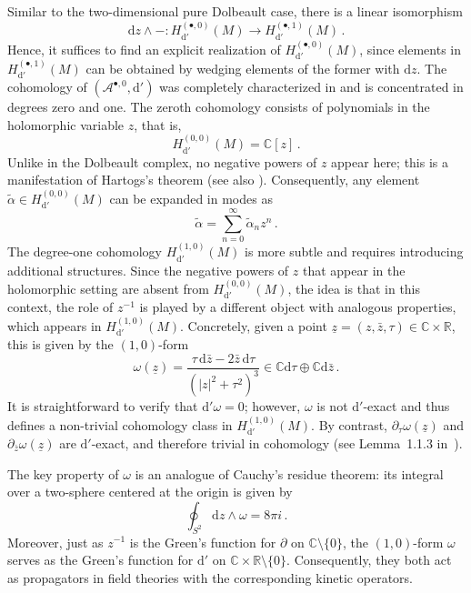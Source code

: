 \documentclass[11pt]{amsart}
\newcommand{\R}{{\mathbb R}}
\newcommand{\C}{{\mathbb C}}
\newcommand{\dr}{{\mathrm{d}}}
\numberwithin{equation}{section}
\numberwithin{figure}{section}
\numberwithin{table}{section}
\renewcommand{\d}{\mathrm{d}}
\theoremstyle{thm}
\numberwithin{equation}{subsection}
\theoremstyle{definition}
\theoremstyle{rem}
\begin{document}
Similar to the two-dimensional pure Dolbeault case, there is a linear isomorphism 
\begin{equation}
\label{ec:lineariso}
    \dr z \wedge -: H^{(\bullet,0)}_{\mathrm{d}'}(M) \to H^{(\bullet,1)}_{\mathrm{d}'}(M) \,.
\end{equation}
Hence, it suffices to find an explicit realization of \( H^{(\bullet,0)}_{\mathrm{d}'}(M) \), since elements in \( H^{(\bullet,1)}_{\mathrm{d}'}(M) \) can be obtained by wedging elements of the former with \(\mathrm{d} z\). The cohomology of \((\mathcal{A}^{\bullet,0}, \mathrm{d}')\) was completely characterized in \cite{Garner:2023zqn} and is concentrated in degrees 
zero and one. The zeroth cohomology consists of polynomials in the holomorphic 
variable \(z\), that is,
\begin{equation}
    H^{(0,0)}_{\mathrm{d}'}(M) = \mathbb{C}[z]\,.
\end{equation}
Unlike in the Dolbeault complex, no negative powers of \(z\) appear here; this is a manifestation of Hartogs's theorem (see also \cite{FAONTE2019389}). 
Consequently, any element \(\tilde{\alpha} \in H^{(0,0)}_{\mathrm{d}'}(M)\) can be 
expanded in modes as
\begin{equation}
    \tilde{\alpha} = \sum_{n=0}^\infty \tilde{\alpha}_n z^n\,.
\end{equation}
The degree-one cohomology \(H^{(1,0)}_{\mathrm{d}'}(M)\) is more subtle and 
requires introducing additional structures. Since the negative powers of 
\(z\) that appear in the holomorphic setting are absent from 
\(H^{(0,0)}_{\mathrm{d}'}(M)\), the idea is that in this context, 
the role of \(z^{-1}\) is played by a different object with analogous properties, 
which appears in \(H^{(1,0)}_{\mathrm{d}'}(M)\). Concretely, given a point $\underline{z} = (z,\bar z,\tau) \in  \C \times \R$, this is given 
by the \((1,0)\)-form
\begin{equation}
\label{ec:omega1}
    \omega(\underline{z}) = \frac{\tau \, \dr \bar{z} - 2 \bar{z} \, \dr \tau}{(|z|^2 + \tau^2)^3} 
    \in \C\d\tau\oplus\C\d\bar z\,.
\end{equation}
It is straightforward to verify that $\dr' \omega = 0$; however, $\omega$ is
not $\dr'$-exact and thus defines a non-trivial cohomology class in \(H^{(1,0)}_{\mathrm{d}'}(M)\). By contrast,
$\partial_\tau \omega(\underline{z})$ and $\partial_{\bar z} \omega(\underline{z})$
are $\dr'$-exact, and therefore trivial in cohomology (see Lemma~1.1.3
in~\cite{Garner:2023zqn}).


The key property 
of \(\omega\) is an analogue of Cauchy's residue theorem: its integral 
over a two-sphere centered at the origin is given by
\begin{equation}
    \oint_{S^2}\dr z \wedge \omega = 8\pi i\,.
\end{equation}
Moreover, just as \( z^{-1} \) is the Green's function for \(\partial\) on 
\(\mathbb{C} \setminus \{0\}\), the \((1,0)\)-form \(\omega\) serves as the 
Green's function for \(\dr'\) on \(\C \times \R  \setminus \{0\}\). 
Consequently, they both act as propagators in field theories with the corresponding kinetic operators.
\end{document}
